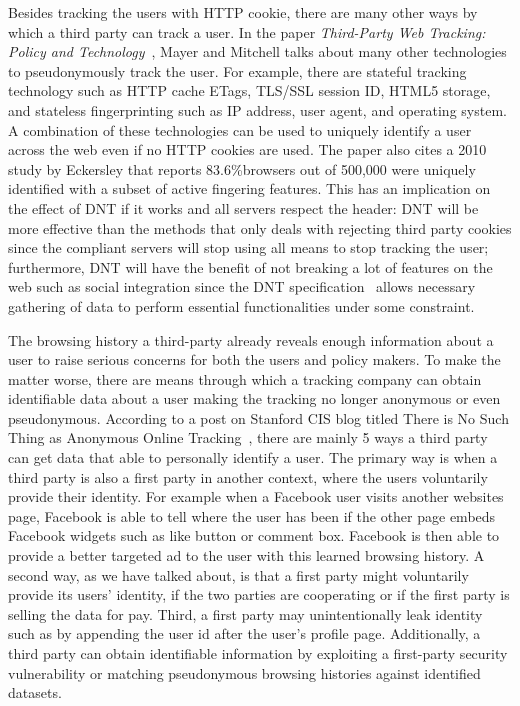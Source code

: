 \documentclass{sig-alternate}
\begin{document}
Besides tracking the users with HTTP cookie, there are many other ways by which a third party can track a user. In the paper \emph{Third-Party Web Tracking: Policy and Technology}~\cite{mayer2012third}, Mayer and Mitchell talks about many other technologies to pseudonymously track the user. For example, there are stateful tracking technology such as HTTP cache ETags, TLS/SSL session ID, HTML5 storage, and stateless fingerprinting such as IP address, user agent, and operating system. A combination of these technologies can be used to uniquely identify a user across the web even if no HTTP cookies are used. The paper also cites a 2010 study by Eckersley that reports 83.6\%browsers out of 500,000 were uniquely identified with a subset of active fingering features. This has an implication on the effect of DNT if it works and all servers respect the header: DNT will be more effective than the methods that only deals with rejecting third party cookies since the compliant servers will stop using all means to stop tracking the user; furthermore, DNT will have the benefit of not breaking a lot of features on the web such as social integration since the DNT specification~\cite{tracking_compliance_20130430} allows necessary gathering of data to perform essential functionalities under some constraint. 

The browsing history a third-party already reveals enough information about a user to raise serious concerns for both the users and policy makers. To make the matter worse, there are means through which a tracking company can obtain identifiable data about a user making the tracking no longer anonymous or even pseudonymous. According to a post on Stanford CIS blog titled There is No Such Thing as Anonymous Online Tracking~\cite{nosuchthing}, there are mainly 5 ways a third party can get data that able to personally identify a user. The primary way is when a third party is also a first party in another context, where the users voluntarily provide their identity. For example when a Facebook user visits another websites page, Facebook is able to tell where the user has been if the other page embeds Facebook widgets such as like button or comment box. Facebook is then able to provide a better targeted ad to the user with this learned browsing history. A second way, as we have talked about, is that a first party might voluntarily provide its users’ identity, if the two parties are cooperating or if the first party is selling the data for pay. Third, a first party may unintentionally leak identity such as by appending the user id after the user’s profile page. Additionally, a third party can obtain identifiable information by exploiting a first-party security vulnerability or matching pseudonymous browsing histories against identified datasets. 
\end{document}
